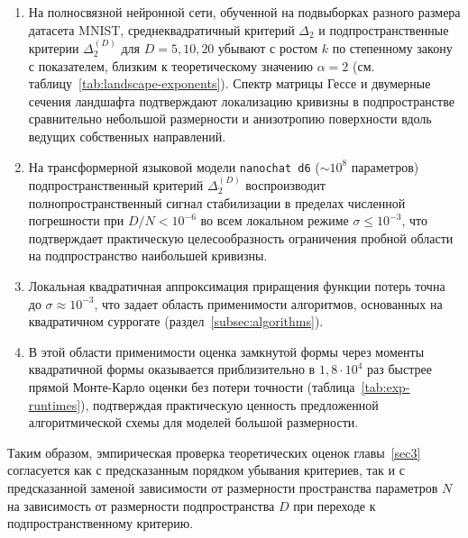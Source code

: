 \begin{enumerate}
    \item На полносвязной нейронной сети, обученной на подвыборках разного размера датасета MNIST, среднеквадратичный критерий $\Delta_2$ и подпространственные критерии $\Delta_2^{(D)}$ для $D=5, 10, 20$ убывают с ростом $k$ по степенному закону с показателем, близким к теоретическому значению $\alpha = 2$ (см. таблицу~\ref{tab:landscape-exponents}). Спектр матрицы Гессе и двумерные сечения ландшафта подтверждают локализацию кривизны в подпространстве сравнительно небольшой размерности и анизотропию поверхности вдоль ведущих собственных направлений.
    \item На трансформерной языковой модели \texttt{nanochat d6} ($\sim 10^8$ параметров) подпространственный критерий $\Delta_2^{(D)}$ воспроизводит полнопространственный сигнал стабилизации в пределах численной погрешности при $D/N < 10^{-6}$ во всем локальном режиме $\sigma \leqslant 10^{-3}$, что подтверждает практическую целесообразность ограничения пробной области на подпространство наибольшей кривизны.
    \item Локальная квадратичная аппроксимация приращения функции потерь точна до $\sigma \approx 10^{-3}$, что задает область применимости алгоритмов, основанных на квадратичном суррогате (раздел~\ref{subsec:algorithms}).
    \item В этой области применимости оценка замкнутой формы через моменты квадратичной формы оказывается приблизительно в $1{,}8\cdot 10^4$ раз быстрее прямой Монте-Карло оценки без потери точности (таблица~\ref{tab:exp-runtimes}), подтверждая практическую ценность предложенной алгоритмической схемы для моделей большой размерности.
\end{enumerate}

Таким образом, эмпирическая проверка теоретических оценок главы~\ref{sec3} согласуется как с предсказанным порядком убывания критериев, так и с предсказанной заменой зависимости от размерности пространства параметров $N$ на зависимость от размерности подпространства $D$ при переходе к подпространственному критерию.
